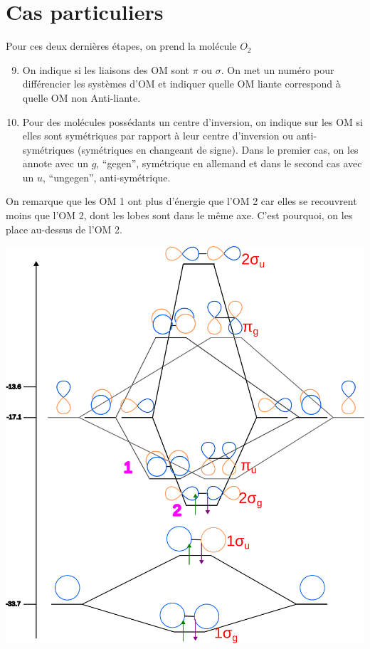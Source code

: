 \documentclass[french]{yLectureNote}
\begin{document}
\section{Cas particuliers}
Pour ces deux dernières étapes, on prend la molécule $O_2$
\begin{enumerate}
\setcounter{enumi}{8}
\item On indique si les liaisons des OM sont $\pi$ ou $\sigma$. On met un numéro pour différencier les systèmes d'OM et indiquer quelle OM liante correspond à quelle OM non Anti-liante.
 \item Pour des molécules possédants un centre d'inversion, on indique sur les OM si elles sont symétriques par rapport à leur centre d'inversion ou anti-symétriques (symétriques en changeant de signe). Dans le premier cas, on les annote avec un $g$, ``gegen'', symétrique en allemand et dans le second cas avec un $u$, ``ungegen'', anti-symétrique.
\end{enumerate}
On remarque que les OM 1 ont plus d'énergie que l'OM 2 car elles se recouvrent moins que l'OM 2, dont les lobes sont dans le m\^eme axe. C'est pourquoi, on les place au-dessus de l'OM 2.

\includegraphics[scale=0.5]{DOM4}
\end{document}
